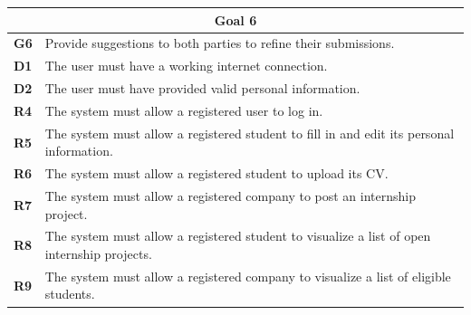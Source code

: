 \begin{table}[H]
    \centering
    \begin{tabular}{|l|m{10cm}|}
        \hline \multicolumn{2}{|c|}{\textbf{Goal 6}} \\
        \hline \textbf{G6} & Provide suggestions to both parties to refine their submissions. \\
        \hline \textbf{D1} & The user must have a working internet connection. \\
        \hline \textbf{D2} & The user must have provided valid personal information. \\
        \hline \textbf{R4} & The system must allow a registered user to log in. \\
        \hline \textbf{R5} & The system must allow a registered student to fill in and edit its personal information. \\
        \hline \textbf{R6} & The system must allow a registered student to upload its CV. \\
        \hline \textbf{R7} & The system must allow a registered company to post an internship project. \\
        \hline \textbf{R8} & The system must allow a registered student to visualize a list of open internship projects. \\
        \hline \textbf{R9} & The system must allow a registered company to visualize a list of eligible students. \\

\end{tabular}
\end{table}
